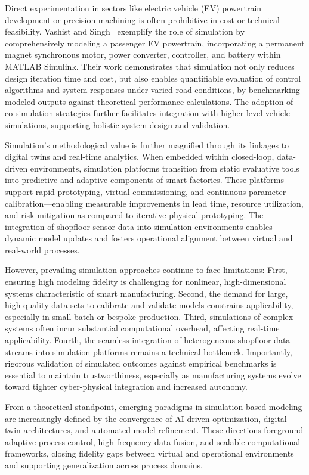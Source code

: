 \documentclass[sigconf]{acmart}
\begin{document}
Direct experimentation in sectors like electric vehicle (EV) powertrain development or precision machining is often prohibitive in cost or technical feasibility. Vashist and Singh~\cite{ref95} exemplify the role of simulation by comprehensively modeling a passenger EV powertrain, incorporating a permanent magnet synchronous motor, power converter, controller, and battery within MATLAB Simulink. Their work demonstrates that simulation not only reduces design iteration time and cost, but also enables quantifiable evaluation of control algorithms and system responses under varied road conditions, by benchmarking modeled outputs against theoretical performance calculations. The adoption of co-simulation strategies further facilitates integration with higher-level vehicle simulations, supporting holistic system design and validation.

Simulation’s methodological value is further magnified through its linkages to digital twins and real-time analytics. When embedded within closed-loop, data-driven environments, simulation platforms transition from static evaluative tools into predictive and adaptive components of smart factories. These platforms support rapid prototyping, virtual commissioning, and continuous parameter calibration—enabling measurable improvements in lead time, resource utilization, and risk mitigation as compared to iterative physical prototyping. The integration of shopfloor sensor data into simulation environments enables dynamic model updates and fosters operational alignment between virtual and real-world processes.

However, prevailing simulation approaches continue to face limitations: First, ensuring high modeling fidelity is challenging for nonlinear, high-dimensional systems characteristic of smart manufacturing. Second, the demand for large, high-quality data sets to calibrate and validate models constrains applicability, especially in small-batch or bespoke production. Third, simulations of complex systems often incur substantial computational overhead, affecting real-time applicability. Fourth, the seamless integration of heterogeneous shopfloor data streams into simulation platforms remains a technical bottleneck. Importantly, rigorous validation of simulated outcomes against empirical benchmarks is essential to maintain trustworthiness, especially as manufacturing systems evolve toward tighter cyber-physical integration and increased autonomy.

From a theoretical standpoint, emerging paradigms in simulation-based modeling are increasingly defined by the convergence of AI-driven optimization, digital twin architectures, and automated model refinement. These directions foreground adaptive process control, high-frequency data fusion, and scalable computational frameworks, closing fidelity gaps between virtual and operational environments and supporting generalization across process domains.
\end{document}
